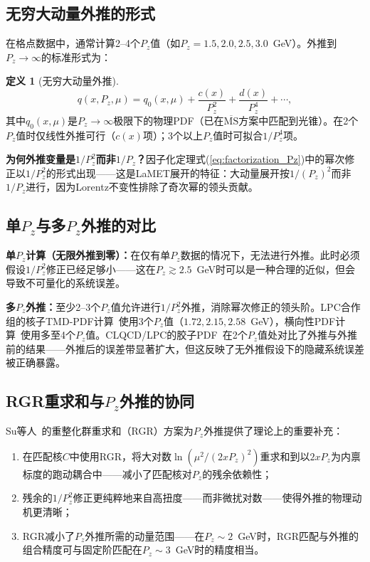 \documentclass[12pt,a4paper]{ctexart}
\theoremstyle{definition}
\newtheorem{definition}{定义}[section]
\begin{document}
\subsection{无穷大动量外推的形式}

在格点数据中，通常计算2--4个$P_z$值（如$P_z = 1.5, 2.0, 2.5, 3.0$~GeV）。外推到$P_z \to \infty$的标准形式为：

\begin{definition}[无穷大动量外推]
\begin{equation}
\boxed{q(x, P_z, \mu) = q_0(x, \mu) + \frac{c(x)}{P_z^2} + \frac{d(x)}{P_z^4} + \cdots},
\label{eq:Pz_extrap}
\end{equation}
其中$q_0(x, \mu)$是$P_z\to\infty$极限下的物理PDF（已在$\overline{\text{MS}}$方案中匹配到光锥）。在2个$P_z$值时仅线性外推可行（$c(x)$项）；3个以上$P_z$值时可拟合$1/P_z^4$项。
\end{definition}

\textbf{为何外推变量是$1/P_z^2$而非$1/P_z$？}因子化定理式(\ref{eq:factorization_Pz})中的幂次修正以$1/P_z^2$的形式出现——这是LaMET展开的特征：大动量展开按$1/(P_z)^2$而非$1/P_z$进行，因为Lorentz不变性排除了奇次幂的领头贡献。

\subsection{单$P_z$与多$P_z$外推的对比}

\textbf{单$P_z$计算（无限外推到零）：}在仅有单$P_z$数据的情况下，无法进行外推。此时必须假设$1/P_z^2$修正已经足够小——这在$P_z \gtrsim 2.5$~GeV时可以是一种合理的近似，但会导致不可量化的系统误差。

\textbf{多$P_z$外推：}至少2--3个$P_z$值允许进行$1/P_z^2$外推，消除幂次修正的领头阶。LPC合作组的核子TMD-PDF计算~\cite{He2024unpolTMD}使用3个$P_z$值（$1.72, 2.15, 2.58$~GeV），横向性PDF计算~\cite{NucleonTransversity2024}使用多至4个$P_z$值。CLQCD/LPC的胶子PDF~\cite{Chen2025gluon}在2个$P_z$值处对比了外推与外推前的结果——外推后的误差带显著扩大，但这反映了无外推假设下的隐藏系统误差被正确暴露。

\subsection{RGR重求和与$P_z$外推的协同}

Su等人~\cite{Su2023RGR}的重整化群重求和（RGR）方案为$P_z$外推提供了理论上的重要补充：

\begin{enumerate}[nosep]
    \item 在匹配核$C$中使用RGR，将大对数$\ln(\mu^2/(2xP_z)^2)$重求和到以$2xP_z$为内禀标度的跑动耦合中——减小了匹配核对$P_z$的残余依赖性；
    \item 残余的$1/P_z^2$修正更纯粹地来自高扭度——而非微扰对数——使得外推的物理动机更清晰；
    \item RGR减小了$P_z$外推所需的动量范围——在$P_z \sim 2$~GeV时，RGR匹配与外推的组合精度可与固定阶匹配在$P_z \sim 3$~GeV时的精度相当。
\end{enumerate}
\end{document}

